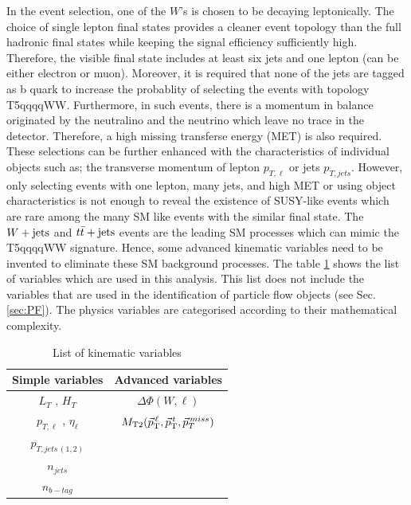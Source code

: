 In the event selection, one of the $W$'s is chosen to be decaying leptonically. The choice of single lepton final states provides a cleaner event topology than the full hadronic final states while keeping the signal efficiency sufficiently high. Therefore, the visible final state includes at least six jets and one lepton (can be either electron or muon). Moreover, it is required that none of the jets are tagged as b quark to increase the probablity of selecting the events with topology T5qqqqWW. Furthermore, in such events, there is a momentum in balance originated by the neutralino and the neutrino which leave no trace in the detector. Therefore, a high missing transferse energy (MET) is also required. These selections can be further enhanced with the characteristics of individual objects such as; the transverse momentum of lepton $p_{T,\ell}$ or jets $p_{T, jets}$. 
However, only selecting events with one lepton, many jets, and high MET or using object characteristics is not enough to reveal the existence of SUSY-like events which are rare among the many SM like events with the similar final state. The $W+\textrm{jets}$ and $t\bar{t}+\textrm{jets}$ events are the leading SM processes which can mimic the T5qqqqWW signature. Hence, some advanced kinematic variables need to be invented to eliminate these SM background processes. The table \ref{tab:KinVar} shows the list of variables which are used in this analysis. This list does not include the variables that are used in the identification of particle flow objects (see Sec. \ref{sec:PF}). The physics variables are categorised according to their mathematical complexity.\\
\renewcommand{\arraystretch}{1.5}
\begin{table}[ht]
\begin{center}
\begin{tabular}{|c|c|}\hline
Simple variables        & Advanced variables \\
\hline
\hline
$L_T$ , $H_T$ & $\Delta\Phi(W,\ell)$ \\
$p_{T,\ell}$ , $\eta_{\ell}$& $M_\mathrm{T2}(\vec{p}_{\text T}^{\,\ell},\vec{p}_{\text T}^{\,t},\vec{p}_T^{\,miss})$  \\
$p_{T,jets\,(1,2)}$ & \\
$n_{jets}$ & \\
$n_{b-tag}$ & \\
\hline
\end{tabular}
\end{center}
\caption{List of kinematic variables}\label{tab:KinVar}
\end{table}
\renewcommand{\arraystretch}{1}
